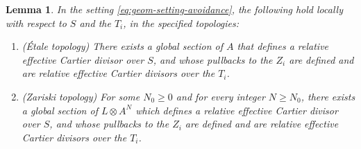 \documentclass[11pt]{article}
\theoremstyle{plain}
\newtheorem{lemma}[theorem]{Lemma}
\theoremstyle{definition}
\begin{document}
\begin{lemma}\label{lemma:prime-avoidance-families}
In the setting \eqref{eq:geom-setting-avoidance}, the following hold locally with respect to $S$ and the $T_{i}$, in the specified topologies:
\begin{enumerate}
\item\label{item:prime-avoidance-families-1} (Étale topology) There exists a global section of $A$ that defines a relative effective Cartier divisor over $S$, and whose pullbacks to the $Z_{i}$ are defined and are relative effective Cartier divisors over the $T_{i}$.
\item\label{item:prime-avoidance-families-2} (Zariski topology) For some $N_{0}\geq 0$ and for every integer $N\geq N_{0}$, there exists a global section of $L\otimes A^{N}$ which defines a relative effective Cartier divisor over $S$, and whose pullbacks to the $Z_{i}$ are defined and are relative effective Cartier divisors over the $T_{i}$.
\end{enumerate}

\end{lemma}
\end{document}
